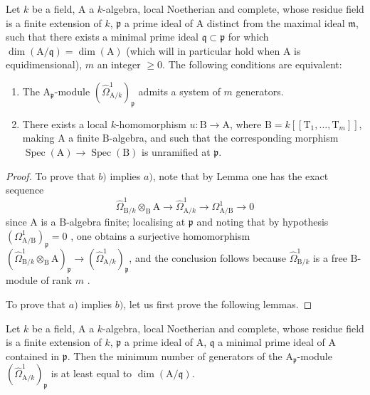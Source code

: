 \begin{proposition}[18.11.5]
\label{IV.18.11.5}
Let $k$ be a field, $\mathrm{A}$ a $k$-algebra, local Noetherian and complete, whose residue field is a finite extension of $k$, $\mathfrak{p}$ a prime ideal of $\mathrm{A}$ distinct from the maximal ideal $\mathfrak{m}$, such that there exists a minimal prime ideal $\mathfrak{q}\subset\mathfrak{p}$ for which $\dim(\mathrm{A}/\mathfrak{q})=\dim(\mathrm{A})$ (which will in particular hold when $\mathrm{A}$ is equidimensional), $m$ an integer $\geq 0$.
The following conditions are equivalent:
\begin{enumerate}[label=\alph*)]
  \item The $\mathrm{A}_\mathfrak{p}$-module $(\hat{\Omega}^1_{\mathrm{A}/k})_\mathfrak{p}$ admits a system of $m$ generators.
  \item There exists a local $k$-homomorphism $u:\mathrm{B}\to\mathrm{A}$, where $\mathrm{B}=k[[\mathrm{T}_1,\ldots,\mathrm{T}_m]]$, making $\mathrm{A}$ a finite $\mathrm{B}$-algebra, and such that the corresponding morphism $\operatorname{Spec}(\mathrm{A})\to\operatorname{Spec}(\mathrm{B})$ is unramified at $\mathfrak{p}$.
\end{enumerate}
\end{proposition}

\begin{proof}
To prove that $b)$ implies $a)$, note that by Lemma  one has the exact sequence
\[
  \hat{\Omega}^1_{\mathrm{B}/k}\otimes_\mathrm{B}\mathrm{A}\to\hat{\Omega}^1_{\mathrm{A}/k}\to\Omega^1_{\mathrm{A}/\mathrm{B}}\to 0
\]
since $\mathrm{A}$ is a $\mathrm{B}$-algebra finite; localising at $\mathfrak{p}$ and noting that by hypothesis $(\Omega^1_{\mathrm{A}/\mathrm{B}})_\mathfrak{p}=0$ , one obtains a surjective homomorphism $(\hat{\Omega}^1_{\mathrm{B}/k}\otimes_\mathrm{B}\mathrm{A})_\mathfrak{p}\to(\hat{\Omega}^1_{\mathrm{A}/k})_\mathfrak{p}$, and the conclusion follows because $\hat{\Omega}^1_{\mathrm{B}/k}$ is a free $\mathrm{B}$-module of rank $m$ .

To prove that $a)$ implies $b)$, let us first prove the following lemmas.
\end{proof}

\begin{lemma}[18.11.5.1]
\label{IV.18.11.5.1}
Let $k$ be a field, $\mathrm{A}$ a $k$-algebra, local Noetherian and complete, whose residue field is a finite extension of $k$, $\mathfrak{p}$ a prime ideal of $\mathrm{A}$, $\mathfrak{q}$ a minimal prime ideal of $\mathrm{A}$ contained in $\mathfrak{p}$.
Then the minimum number of generators of the $\mathrm{A}_\mathfrak{p}$-module $(\hat{\Omega}^1_{\mathrm{A}/k})_\mathfrak{p}$ is at least equal to $\dim(\mathrm{A}/\mathfrak{q})$.
\end{lemma}

